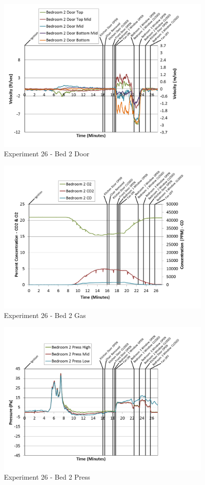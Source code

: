 \documentclass{article}
\begin{document}
\begin{appendices}
\clearpage

\begin{figure}[h!]
	\centering
	\includegraphics[height=3.05in]{0_Images/Results_Charts/Exp_26_Charts/Bed2Door.png}
	\caption{Experiment 26 - Bed 2 Door}
\end{figure}


\begin{figure}[h!]
	\centering
	\includegraphics[height=3.05in]{0_Images/Results_Charts/Exp_26_Charts/Bed2Gas.png}
	\caption{Experiment 26 - Bed 2 Gas}
\end{figure}

\clearpage

\begin{figure}[h!]
	\centering
	\includegraphics[height=3.05in]{0_Images/Results_Charts/Exp_26_Charts/Bed2Press.png}
	\caption{Experiment 26 - Bed 2 Press}
\end{figure}



\end{appendices}
\end{document}
